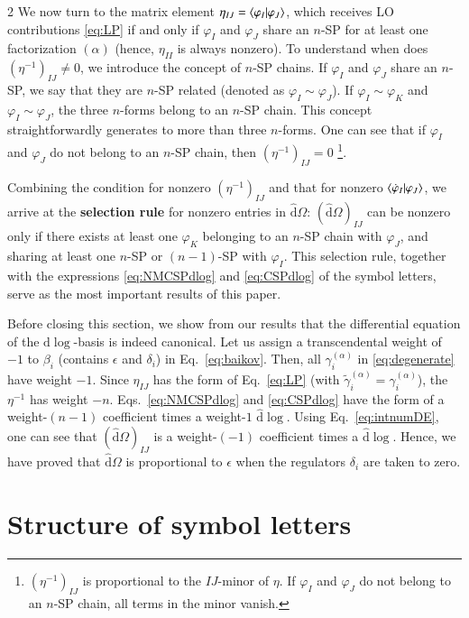 \documentclass[fleqn]{2023SCGE}
\newcommand{\nd}{\mathrm{d}}
\newcommand{\nds}{\hat{\mathrm{d}}}
\begin{document}
\begin{multicols}{2}
We now turn to the matrix element $\eta_{IJ}=\braket{\varphi_I|\varphi_J}$, which receives LO contributions \eqref{eq:LP} if and only if $\varphi_I$ and $\varphi_J$ share an $n$-SP for at least one factorization $(\alpha)$ (hence, $\eta_{II}$ is always nonzero). To understand when does $(\eta^{-1})_{IJ}\neq 0$, we introduce the concept of $n$-SP chains. If $\varphi_I$ and $\varphi_J$ share an $n$-SP, we say that they are $n$-SP related (denoted as $\varphi_I \sim \varphi_J$). If $\varphi_I \sim \varphi_K$ and $\varphi_I \sim \varphi_J$, the three $n$-forms belong to an $n$-SP chain. This concept straightforwardly generates to more than three $n$-forms. One can see that if $\varphi_I$ and $\varphi_J$ do not belong to an $n$-SP chain, then $(\eta^{-1})_{IJ}= 0$
\footnote{$(\eta^{-1})_{IJ}$ is proportional to the $IJ$-minor of $\eta$. If $\varphi_I$ and $\varphi_J$ do not belong to an $n$-SP chain, all terms in the minor vanish.}.


Combining the condition for nonzero $(\eta^{-1})_{IJ}$ and that for nonzero $\braket{\dot{\varphi}_I|\varphi_J}$, we arrive at the \textbf{selection rule} for nonzero entries in $\nds \Omega$: $(\nds \Omega)_{IJ}$ can be nonzero only if there exists at least one $\varphi_K$ belonging to an $n$-SP chain with $\varphi_J$, and sharing at least one $n$-SP or $(n-1)$-SP with $\varphi_I$. This selection rule, together with the expressions \eqref{eq:NMCSPdlog} and \eqref{eq:CSPdlog} of the symbol letters, serve as the most important results of this paper.

Before closing this section, we show from our results that the differential equation of the $\nd\log$-basis is indeed canonical. Let us assign a transcendental weight of $-1$ to $\beta_i$  (contains $\epsilon$ and $\delta_i$) in Eq.~\eqref{eq:baikov}. Then, all $\gamma^{(\alpha)}_i$ in \eqref{eq:degenerate}
have weight $-1$. Since $\eta_{IJ}$ has the form of Eq.~\eqref{eq:LP} (with $\tilde{\gamma}^{(\alpha)}_i=\gamma^{(\alpha)}_i$), the $\eta^{-1}$ has weight $-n$. Eqs.~\eqref{eq:NMCSPdlog} and \eqref{eq:CSPdlog} have the form of a weight-$(n-1)$ coefficient times a weight-$1$ $\nds \log$. Using Eq.~\eqref{eq:intnumDE}, one can see that $(\nds\Omega)_{IJ}$ is a weight-$(-1)$ coefficient times a $\nds \log$. Hence, we have proved that $\nds\Omega$ is proportional to $\epsilon$ when the regulators $\delta_i$ are taken to zero.

\section{Structure of symbol letters}


\end{multicols}
\end{document}
